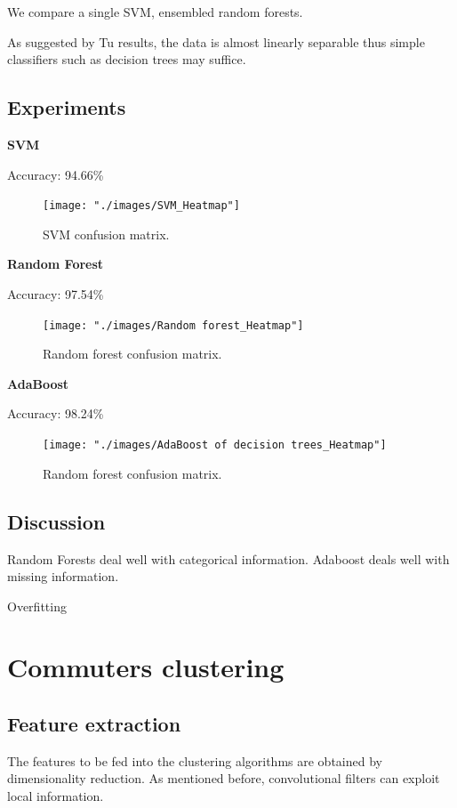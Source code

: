 \documentclass{article}
\begin{document}
We compare a single SVM, ensembled random forests. 

As suggested by Tu \cite{tu2016impact} results, the data is almost linearly separable thus simple classifiers such as decision trees may suffice. 



\subsection{Experiments}

\textbf{SVM}

Accuracy: 94.66\%

\begin{figure}[H]
  \centering
  \texttt{[image: "./images/SVM\_Heatmap"]}
  \caption{SVM confusion matrix.}
  \label{fig:classification/svm_confusion}
\end{figure}
  
\textbf{Random Forest}  

Accuracy: 97.54\%

\begin{figure}[H]
  \centering
  \texttt{[image: "./images/Random forest\_Heatmap"]}
  \caption{Random forest confusion matrix.}
  \label{fig:classification/rf_confusion}
\end{figure}


\textbf{AdaBoost}  

Accuracy: 98.24\%


\begin{figure}[H]
  \centering
  \texttt{[image: "./images/AdaBoost of decision trees\_Heatmap"]}
  \caption{Random forest confusion matrix.}
  \label{fig:classification/adb_confusion}
\end{figure}


\subsection{Discussion}
Random Forests deal well with categorical information. Adaboost deals well with missing information.

Overfitting



\newpage
\section{Commuters clustering}
\label{sec:partIII}

\subsection{Feature extraction}
The features to be fed into the clustering algorithms are obtained by dimensionality reduction. As mentioned before, convolutional filters can exploit local information.
\end{document}
